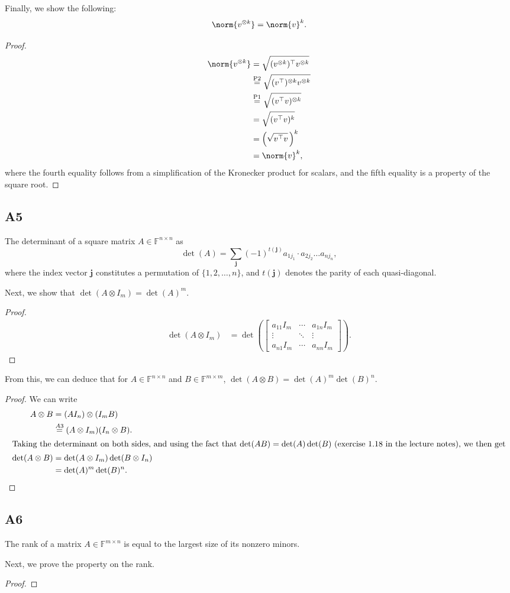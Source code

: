 \documentclass[11pt]{article}
\newcommand{\field}{\mathbb{F}} %
\newcommand{\kp}{\otimes} %
\begin{document}
Finally, we show the following:
\[
\norm{v^{\kp k}} = \norm{v}^k.
\]
\begin{proof}
\begin{align*}
\norm{v^{\kp k}} &= \sqrt{(v^{\kp k})^\top v^{\kp k}}\\
&\overset{\textnormal{P2}}{=} \sqrt{(v^\top)^{\kp k} v^{\kp k}}\\
&\overset{\textnormal{P1}}{=} \sqrt{(v^\top v)^{\kp k}}\\
&= \sqrt{(v^\top v)^k}\\
&= \Big(\sqrt{v^\top v}\,\Big)^k\\
&= \norm{v}^k,
\end{align*}
where the fourth equality follows from a simplification of the Kronecker product for scalars, and the fifth equality is a property of the square root.
\end{proof}

\subsection*{A5}
The determinant of a square matrix \(A \in \field^{n \times n}\) as
\[
\det(A) = \sum_{\bm{j}}(-1)^{t(\bm{j})} a_{1 j_1} \cdot a_{2 j_2} \dots a_{n j_n},
\]
where the index vector \(\bm{j}\) constitutes a permutation of \(\{1, 2, \dots, n\}\), and \(t(\bm{j})\) denotes the parity of each quasi-diagonal.

Next, we show that \(\det(A \kp I_m) = \det(A)^m\).
\begin{proof}
\begin{align*}
\det(A \kp I_m) &= \det \left(\begin{bmatrix}
a_{11} I_m & \cdots & a_{1n} I_m \\
\vdots & \ddots & \vdots \\
a_{n1} I_m & \cdots & a_{nn} I_m
\end{bmatrix}\right).
\end{align*}
\end{proof}

From this, we can deduce that for \(A \in \field^{n \times n}\) and \(B \in \field^{m \times m}\), \(\det(A \kp B) = \det(A)^m \det(B)^n\).
\begin{proof}
We can write
\begin{align*}
A \kp B &= (A I_n) \kp (I_m B)\\
&\overset{A3}{=} (A \kp I_m) (I_n \kp B).\\
\intertext{Taking the determinant on both sides, and using the fact that 
\(\det(AB) = \det(A)\det(B)\) (exercise 1.18 in the lecture notes), we then get}
\det(A \kp B) &= \det(A \kp I_m) \det(B \kp I_n)\\
&= \det(A)^m \det(B)^n.\qedhere
\end{align*}
\end{proof}

\subsection*{A6}
The rank of a matrix \(A \in \field^{m \times n}\) is equal to the largest size of its nonzero minors.

Next, we prove the property on the rank.
\begin{proof}
\end{proof}

\end{document}

